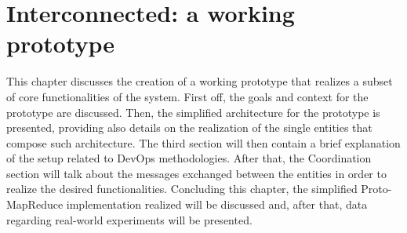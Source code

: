 \chapter{Interconnected: a working prototype}
This chapter discusses the creation of a working prototype that realizes a subset of core functionalities of the system. First off, the goals and context for the prototype are discussed. Then, the simplified architecture for the prototype is presented, providing also details on the realization of the single entities that compose such architecture. The third section will then contain a brief explanation of the setup related to DevOps methodologies. After that, the Coordination section will talk about the messages exchanged between the entities in order to realize the desired functionalities. Concluding this chapter, the simplified Proto-MapReduce implementation realized will be discussed and, after that, data regarding real-world experiments will be presented. 






